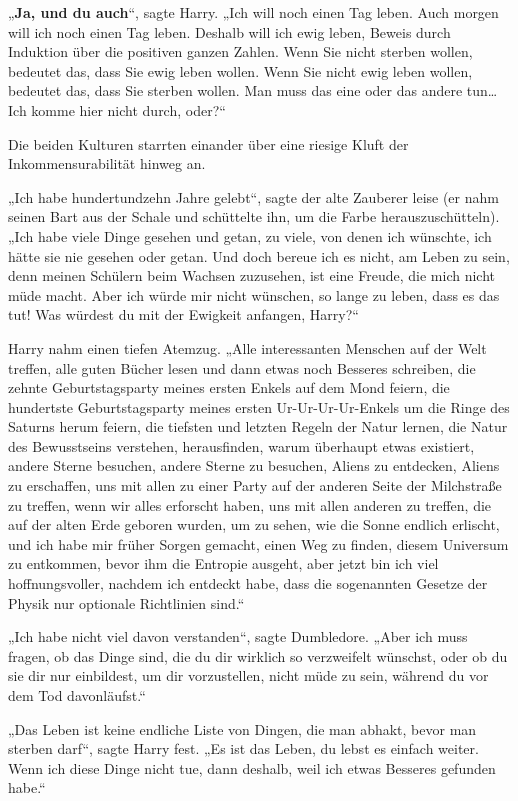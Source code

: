 {„\textbf{Ja, und du auch}“, sagte Harry. „Ich will noch einen Tag leben. Auch morgen will ich noch einen Tag leben. Deshalb will ich ewig leben, Beweis durch Induktion über die positiven ganzen Zahlen. Wenn Sie nicht sterben wollen, bedeutet das, dass Sie ewig leben wollen. Wenn Sie nicht ewig leben wollen, bedeutet das, dass Sie sterben wollen. Man muss das eine oder das andere tun… Ich komme hier nicht durch, oder?“

Die beiden Kulturen starrten einander über eine riesige Kluft der Inkommensurabilität hinweg an.

„Ich habe hundertundzehn Jahre gelebt“, sagte der alte Zauberer leise (er nahm seinen Bart aus der Schale und schüttelte ihn, um die Farbe herauszuschütteln). „Ich habe viele Dinge gesehen und getan, zu viele, von denen ich wünschte, ich hätte sie nie gesehen oder getan. Und doch bereue ich es nicht, am Leben zu sein, denn meinen Schülern beim Wachsen zuzusehen, ist eine Freude, die mich nicht müde macht. Aber ich würde mir nicht wünschen, so lange zu leben, dass es das tut! Was würdest du mit der Ewigkeit anfangen, Harry?“

Harry nahm einen tiefen Atemzug. „Alle interessanten Menschen auf der Welt treffen, alle guten Bücher lesen und dann etwas noch Besseres schreiben, die zehnte Geburtstagsparty meines ersten Enkels auf dem Mond feiern, die hundertste Geburtstagsparty meines ersten Ur-Ur-Ur-Ur-Enkels um die Ringe des Saturns herum feiern, die tiefsten und letzten Regeln der Natur lernen, die Natur des Bewusstseins verstehen, herausfinden, warum überhaupt etwas existiert, andere Sterne besuchen, andere Sterne zu besuchen, Aliens zu entdecken, Aliens zu erschaffen, uns mit allen zu einer Party auf der anderen Seite der Milchstraße zu treffen, wenn wir alles erforscht haben, uns mit allen anderen zu treffen, die auf der alten Erde geboren wurden, um zu sehen, wie die Sonne endlich erlischt, und ich habe mir früher Sorgen gemacht, einen Weg zu finden, diesem Universum zu entkommen, bevor ihm die Entropie ausgeht, aber jetzt bin ich viel hoffnungsvoller, nachdem ich entdeckt habe, dass die sogenannten Gesetze der Physik nur optionale Richtlinien sind.“

„Ich habe nicht viel davon verstanden“, sagte Dumbledore. „Aber ich muss fragen, ob das Dinge sind, die du dir wirklich so verzweifelt wünschst, oder ob du sie dir nur einbildest, um dir vorzustellen, nicht müde zu sein, während du vor dem Tod davonläufst.“

„Das Leben ist keine endliche Liste von Dingen, die man abhakt, bevor man sterben darf“, sagte Harry fest. „Es ist das Leben, du lebst es einfach weiter. Wenn ich diese Dinge nicht tue, dann deshalb, weil ich etwas Besseres gefunden habe.“

}
